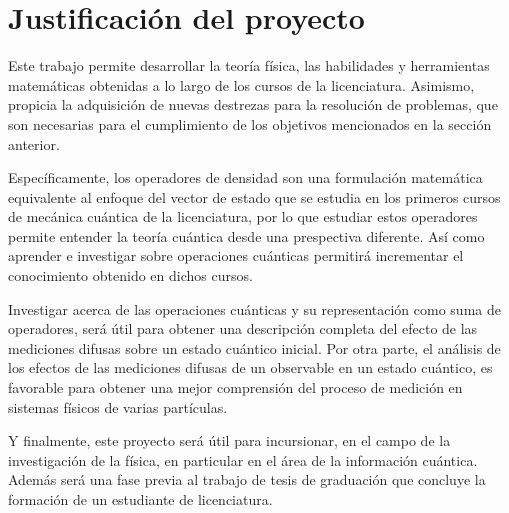 \section{Justificación del proyecto}

	  Este trabajo permite desarrollar la teoría física, las habilidades y herramientas matemáticas obtenidas a lo largo de los cursos de la licenciatura. Asimismo, propicia la adquisición de nuevas destrezas para la resolución de problemas, que son necesarias para el cumplimiento de los objetivos mencionados en la sección anterior. 
	  
	  Específicamente, los operadores de densidad son una formulación matemática equivalente al enfoque del vector de estado que se estudia en los primeros cursos de mecánica cuántica de la licenciatura, por lo que estudiar estos operadores permite entender la teoría cuántica desde una prespectiva diferente. Así como aprender e investigar sobre operaciones cuánticas permitirá incrementar el conocimiento obtenido en dichos cursos.
	  


Investigar acerca de las operaciones cuánticas y su representación como suma de operadores, será útil para obtener una descripción completa del efecto de las mediciones difusas sobre un estado cuántico inicial. Por otra parte, el análisis de los efectos de las mediciones difusas de un observable en un estado cuántico, es favorable para obtener una mejor comprensión del proceso de medición en sistemas físicos de varias partículas.
 
  
  
 
  
 Y finalmente, este proyecto será útil para incursionar, en el campo de la investigación de la física, en particular en el área de la información cuántica. Además será una fase previa al trabajo de tesis de graduación que concluye la formación de un estudiante de licenciatura.    
